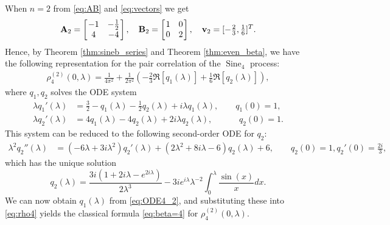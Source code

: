 \documentclass[12pt]{article}
\theoremstyle{definition} %
\theoremstyle{remark} %
\newcommand{\Sine}{\operatorname{Sine}}
\newcommand{\mat}[4]{\left[ \hspace{-0.4em} \begin{array}{cc}
#1 & #2  \\
#3 & #4  \\
\end{array} \hspace{-0.4em}\right]}
\begin{document}
When $n=2$ from \eqref{eq:AB} and \eqref{eq:vectors} we get 
\[
\mathbf{A}_2=\mat{-1}{-\frac12}{4}{-4}, \quad \mathbf{B}_2=\mat{1}{0}{0}{2}, \quad \mathbf{v}_2=[-\tfrac23, \tfrac16]^T.
\]
Hence, by Theorem \ref{thm:sineb_series} and Theorem \ref{thm:even_beta}, we have the following representation for the pair correlation of the  $\Sine_4$ process: 
\begin{align}\label{eq:rho4}
     \rho^{(2)}_{4}(0,\lambda)=\frac{1}{4\pi^2}+\frac1{2\pi^2}\left(-\frac{2}{3} \Re[q_1(\lambda)]+\frac16\Re[q_2(\lambda)]\right),
\end{align}
where $q_1, q_2$ solves the ODE system 
\begin{align}\label{eq:ODE4_1}
    \lambda q_1'(\lambda)&=\frac32-q_1(\lambda)-\frac12 q_2(\lambda)+i \lambda q_1(\lambda),\qquad q_1(0)=1,\\
    \lambda q_2'(\lambda)&=4 q_1(\lambda)-4 q_2(\lambda)+2 i \lambda q_2(\lambda), \qquad \phantom{....}q_2(0)=1.\label{eq:ODE4_2}
\end{align}
This system can be reduced to the following second-order ODE for $q_2$:
\begin{align*}
    \lambda^2 q_2''(\lambda)&=\left(-6 \lambda +3 i \lambda ^2\right) q_2'(\lambda )+\left(2 \lambda ^2+8 i \lambda -6\right) q_2(\lambda )+6,\qquad q_2(0)=1, q_2'(0)=\frac{2 i}{3},
\end{align*}
which  has the unique solution
\[
q_2(\lambda)=
\frac{3i(1+2i\lambda-e^{2i \lambda})}{2\lambda^3}-3i e^{i \lambda}\lambda^{-2}\int_0^\lambda \frac{\sin(x)}{x}dx.
\]
We can now obtain $q_1(\lambda)$ from \eqref{eq:ODE4_2}, 
and substituting these into  \eqref{eq:rho4} yields
the classical formula  \eqref{eq:beta=4} for  $\rho^{(2)}_{4}(0,\lambda)$.
\medskip
\end{document}
